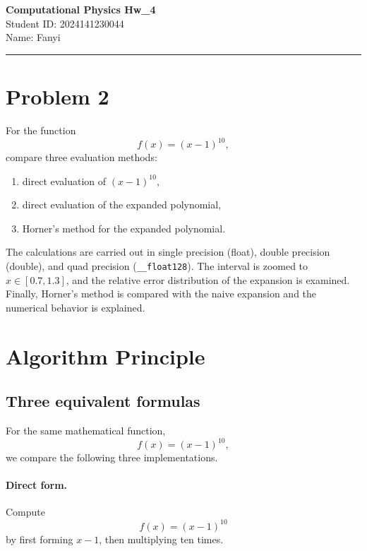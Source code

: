 \documentclass[12pt,a4paper]{article}
\newcommand{\HomeworkTitle}{Computational Physics Hw\_4}
\newcommand{\StudentID}{2024141230044}
\newcommand{\StudentName}{Fanyi}
\begin{document}
\begin{center}
    {\LARGE \textbf{\HomeworkTitle}}\\[1.2em]
    {\large Student ID: \StudentID}\\[0.5em]
    {\large Name: \StudentName}
\end{center}

\vspace{0.5em}
\noindent\rule{\textwidth}{0.8pt}
\vspace{0.5em}

\section*{Problem 2}

For the function
\[
    f(x)=(x-1)^{10},
\]
compare three evaluation methods:
\begin{enumerate}[leftmargin=2.5em]
    \item direct evaluation of $(x-1)^{10}$,
    \item direct evaluation of the expanded polynomial,
    \item Horner's method for the expanded polynomial.
\end{enumerate}
The calculations are carried out in single precision (float), double precision (double), and quad precision (\texttt{\_\_float128}). The interval is zoomed to $x\in[0.7,1.3]$, and the relative error distribution of the expansion is examined. Finally, Horner's method is compared with the naive expansion and the numerical behavior is explained.

\newpage
\tableofcontents
\newpage

\section{Algorithm Principle}

\subsection{Three equivalent formulas}
For the same mathematical function,
\[
    f(x)=(x-1)^{10},
\]
we compare the following three implementations.

\paragraph{Direct form.}
Compute
\[
    f(x)=(x-1)^{10}
\]
by first forming $x-1$, then multiplying ten times.
\end{document}
